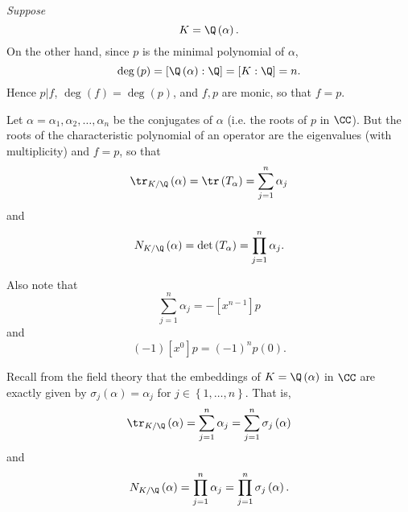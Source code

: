 \documentclass[pmath441]{subfiles}
\begin{document}
    \begin{case}
        \textit{Suppose}
        \begin{equation*}
            K = \Q\left( \alpha \right).
        \end{equation*}
        On the other hand, since $p$ is the minimal polynomial of $\alpha$,
        \begin{equation*}
            \deg\left( p \right) = \left[ \Q\left( \alpha \right):\Q \right] = \left[ K:\Q \right] = n.
        \end{equation*}
        Hence $p|f$, $\deg\left( f \right) = \deg\left( p \right)$, and $f,p$ are monic, so that $f=p$.

        Let $\alpha = \alpha_1, \alpha_2, \ldots, \alpha_n$ be the conjugates of $\alpha$ (i.e. the roots of $p$ in $\CC$). But the roots of the characteristic polynomial of an operator are the eigenvalues (with multiplicity) and $f=p$, so that
        \begin{equation*}
            \tr_{K /\Q}\left( \alpha \right) = \tr\left( T_{\alpha} \right) = \sum^{n}_{j=1} \alpha_j
        \end{equation*}
        and
        \begin{equation*}
            N_{K /\Q}\left( \alpha \right) = \det\left( T_{\alpha} \right) = \prod^{n}_{j=1} \alpha_j.
        \end{equation*}

        Also note that
        \begin{equation*}
            \sum^{n}_{j=1} \alpha_j = -\left[ x^{n-1} \right]p 
        \end{equation*}
        and
        \begin{equation*}
            \left( -1 \right)\left[ x^0 \right]p = \left( -1 \right)^np\left( 0 \right).
        \end{equation*}

        Recall from the field theory that the embeddings of $K=\Q\left( \alpha \right)$ in $\CC$ are exactly given by $\sigma_j\left( \alpha \right) = \alpha_j$ for $j\in\left\lbrace 1,\ldots,n \right\rbrace$. That is,
        \begin{equation*}
            \tr_{K /\Q}\left( \alpha \right) = \sum^{n}_{j=1}\alpha_j = \sum^{n}_{j=1} \sigma_j\left( \alpha \right)
        \end{equation*}
        and
        \begin{equation*}
            N_{K /\Q}\left( \alpha \right) = \prod^{n}_{j=1}\alpha_j = \prod^{n}_{j=1}\sigma_j\left( \alpha \right).
        \end{equation*}
    \end{case}
    
\end{document}
